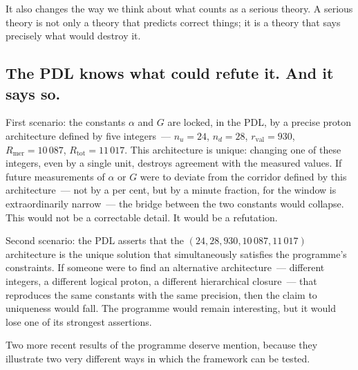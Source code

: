 \documentclass[12pt, a4paper, openright]{book}
\begin{document}
\medskip

It also changes the way we think about what counts as a serious theory. A serious theory is not only a theory that predicts correct things; it is a theory that says precisely what would destroy it.

\subsection*{The PDL knows what could refute it. And it says so.}

First scenario: the constants $\alpha$ and $G$ are locked, in the PDL, by a precise proton architecture defined by five integers~--- $n_u = 24$, $n_d = 28$, $r_\text{val} = 930$, $R_\text{mer} = 10\,087$, $R_\text{tot} = 11\,017$. This architecture is unique: changing one of these integers, even by a single unit, destroys agreement with the measured values. If future measurements of $\alpha$ or $G$ were to deviate from the corridor defined by this architecture~--- not by a per cent, but by a minute fraction, for the window is extraordinarily narrow~--- the bridge between the two constants would collapse. This would not be a correctable detail. It would be a refutation.

\medskip

Second scenario: the PDL asserts that the $(24, 28, 930, 10\,087, 11\,017)$ architecture is the unique solution that simultaneously satisfies the programme's constraints. If someone were to find an alternative architecture~--- different integers, a different logical proton, a different hierarchical closure~--- that reproduces the same constants with the same precision, then the claim to uniqueness would fall. The programme would remain interesting, but it would lose one of its strongest assertions.

\medskip

Two more recent results of the programme deserve mention, because they illustrate two very different ways in which the framework can be tested.

\medskip
\end{document}
